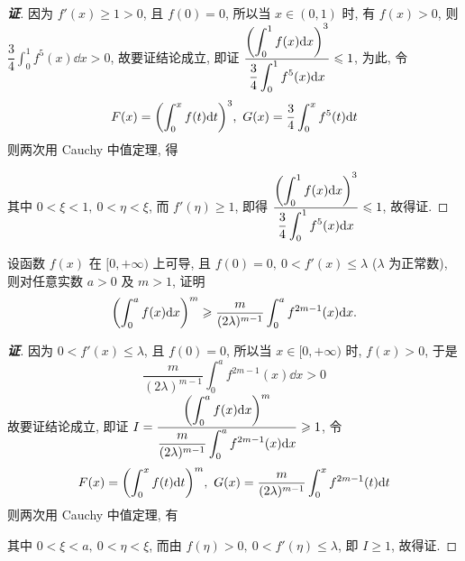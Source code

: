 \begin{proof}[{\songti \textbf{证}}]
    因为 $f'(x)\geqslant 1>0$, 且 $f(0)=0$, 所以当 $x\in(0,1)$ 时, 有 $f(x)>0$, 则 $\dfrac{3}{4}\displaystyle\int_{0}^{1}f^5(x)\dd x>0$, 故要证结论成立, 即证
    $\displaystyle\dfrac{\qty(\displaystyle\int_{0}^{1}f(x)\dd x)^3}{\dfrac{3}{4}\displaystyle\int_{0}^{1}f^5(x)\dd x}\leqslant 1$, 为此, 令
    $$F(x)=\qty(\int_{0}^{x}f(t)\dd t)^3,~G(x)=\dfrac{3}{4}\int_{0}^{x}f^5(t)\dd t$$
    则两次用 Cauchy 中值定理, 得
    其中 $0<\xi<1,~0<\eta<\xi$, 而 $f'(\eta)\geqslant 1$, 即得 $\displaystyle\dfrac{\qty(\displaystyle\int_{0}^{1}f(x)\dd x)^3}{\dfrac{3}{4}\displaystyle\int_{0}^{1}f^5(x)\dd x}\leqslant 1$, 故得证.
\end{proof}

\begin{inference}
    设函数 $f(x)$ 在 $[0,+\infty)$ 上可导, 且 $f(0)=0,~0< f'(x)\leqslant \lambda$ ($\lambda$ 为正常数), 则对任意实数 $a>0$ 及 $m>1$, 证明
    $$\qty(\int_{0}^{a}f(x)\dd x)^m\geqslant \dfrac{m}{(2\lambda)^{m-1}}\int_{0}^{a}f^{2m-1}(x)\dd x.$$
\end{inference}
\begin{proof}[{\songti \textbf{证}}]
    因为 $0<f'(x)\leqslant \lambda$, 且 $f(0)=0$, 所以当 $x\in[0,+\infty)$ 时, $f(x)>0$, 于是 $$\displaystyle\dfrac{m}{(2\lambda)^{m-1}}\int_{0}^{a}f^{2m-1}(x)\dd x>0$$
    故要证结论成立, 即证 $I=\dfrac{\qty(\displaystyle\int_{0}^{a}f(x)\dd x)^m}{\dfrac{m}{(2\lambda)^{m-1}}\displaystyle\int_{0}^{a}f^{2m-1}(x)\dd x}\geqslant 1$,
    令 $$\displaystyle F(x)=\qty(\int_{0}^{x}f(t)\dd t)^m,~G(x)=\dfrac{m}{(2\lambda)^{m-1}}\int_{0}^{x}f^{2m-1}(t)\dd t$$
    则两次用 Cauchy 中值定理, 有
    其中 $0<\xi<a,~0<\eta<\xi$, 而由 $f(\eta)>0,~0<f'(\eta)\leqslant \lambda$, 即 $I\geqslant 1$, 故得证.
\end{proof}

